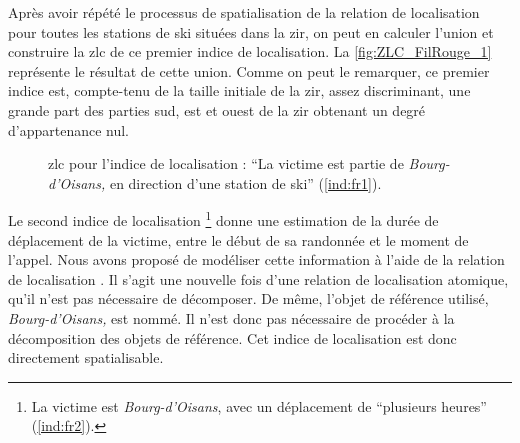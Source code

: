 Après avoir répété le processus de spatialisation de la relation de
localisation  pour
toutes les stations de ski situées dans la \ac{zir}, on peut en
calculer l'union et construire la \ac{zlc} de ce premier indice de
localisation. La \autoref{fig:ZLC_FilRouge_1} représente le résultat
de cette union.
%
Comme on peut le remarquer, ce premier indice est, compte-tenu de la
taille initiale de la \ac{zir}, assez discriminant, une grande part
des parties sud, est et ouest de la \ac{zir} obtenant un degré
d'appartenance nul.

\begin{figure}[h]
  \centering
  
  \caption{\ac{zlc} pour l'indice de localisation : \enquote{La
      victime est partie de \emph{Bourg-d'Oisans,} en direction d'une
      station de ski} (\ref{ind:fr1}).}
  \label{fig:ZLC_FilRouge_1}
\end{figure}


Le second indice de localisation \footnote{La victime est
   \emph{Bourg-d’Oisans}, avec un
  déplacement de \enquote{plusieurs heures} (\ref{ind:fr2}).} donne
une estimation de la durée de déplacement de la victime, entre le
début de sa randonnée et le moment de l'appel. Nous avons proposé de
modéliser cette information à l'aide de la relation de localisation
. Il s'agit une nouvelle fois
d'une relation de localisation atomique, qu'il n'est pas nécessaire de
décomposer. De même, l'objet de référence utilisé,
\emph{Bourg-d'Oisans,} est nommé. Il n'est donc pas nécessaire de
procéder à la décomposition des objets de référence. Cet indice de
localisation est donc directement spatialisable.

